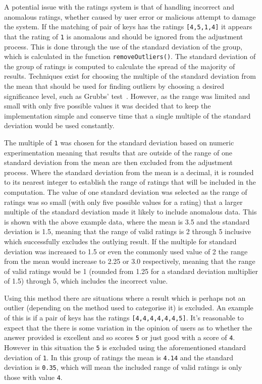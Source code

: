 \documentclass[authoryearcitations]{UoYCSproject}
\begin{document}
A potential issue with the ratings system is that of handling incorrect and anomalous ratings, whether caused by user error or malicious attempt to damage the system. If the matching of pair of keys has the ratings \texttt{[4,5,1,4]} it appears that the rating of \texttt{1} is anomalous and should be ignored from the adjustment process. This is done through the use of the standard deviation of the group, which is calculated in the function \texttt{removeOutliers()}. The standard deviation of the group of ratings is computed to calculate the spread of the majority of results. Techniques exist for choosing the multiple of the standard deviation from the mean that should be used for finding outliers by choosing a desired significance level, such as Grubbs' test~\cite{grubbs1969procedures}. However, as the range was limited and small with only five possible values it was decided that to keep the implementation simple and conserve time that a single multiple of the standard deviation would be used constantly.

The multiple of \texttt{1} was chosen for the standard deviation based on numeric experimentation meaning that results that are outside of the range of one standard deviation from the mean are then excluded from the adjustment process. Where the standard deviation from the mean is a decimal, it is rounded to its nearest integer to establish the range of ratings that will be included in the computation. The value of one standard deviation was selected as the range of ratings was so small (with only five possible values for a rating) that a larger multiple of the standard deviation made it likely to include anomalous data. This is shown with the above example data, where the mean is 3.5 and the standard deviation is 1.5, meaning that the range of valid ratings is 2 through 5 inclusive which successfully excludes the outlying result. If the multiple for standard deviation was increased to 1.5 or even the commonly used value of 2 the range from the mean would increase to 2.25 or 3.0 respectively, meaning that the range of valid ratings would be 1 (rounded from 1.25 for a standard deviation multiplier of 1.5) through 5, which includes the incorrect value.

Using this method there are situations where a result which is perhaps not an outlier (depending on the method used to categorise it) is excluded. An example of this is if a pair of keys has the ratings \texttt{[4,4,4,4,4,4,5]}. It's reasonable to expect that the there is some variation in the opinion of users as to whether the answer provided is excellent and so scores \texttt{5} or just good with a score of \texttt{4}.  However in this situation the \texttt{5} is excluded using the aforementioned standard deviation of \texttt{1}. In this group of ratings the mean is \texttt{4.14} and the standard deviation is \texttt{0.35}, which will mean the included range of valid ratings is only those with value \texttt{4}.
\end{document}
